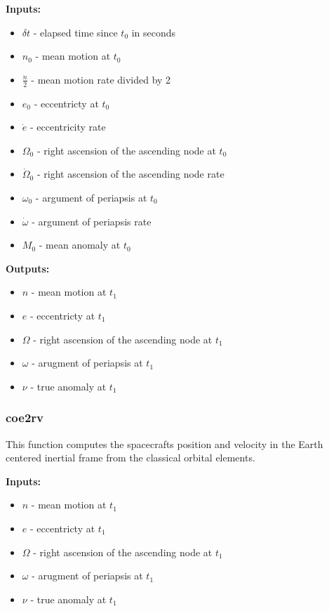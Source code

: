 \documentclass[11pt, reqno]{article}    %
\begin{document}
\noindent \textbf{Inputs: }
\begin{itemize}
    \item \( \delta t \) - elapsed time since \( t_0 \) in seconds
    \item \( n_0 \) - mean motion at \( t_0 \)
    \item \( \frac{\dot{n}}{2} \) - mean motion rate divided by 2
    \item \( e_0 \) - eccentricty at \( t_0 \)
    \item \( \dot{e} \) - eccentricity rate
    \item \( \Omega_0 \) - right ascension of the ascending node at \( t_0 \)
    \item \( \dot{\Omega}_0 \) - right ascension of the ascending node rate
    \item \( \omega_0 \) - argument of periapsis at \( t_0 \)
    \item \( \dot{\omega} \) - argument of periapsis rate
    \item \( M_0 \) - mean anomaly at \( t_0 \)
\end{itemize}

\noindent \textbf{Outputs:}

\begin{itemize}
    \item \( n \) - mean motion at \( t_1 \)
    \item \( e \) - eccentricty at \( t_1 \)
    \item \( \Omega \) - right ascension of the ascending node at \( t_1 \)
    \item \( \omega \) - arugment of periapsis at \( t_1 \)
    \item \( \nu \) - true anomaly at \( t_1 \)
\end{itemize}

\subsubsection*{\textbf{coe2rv}}
This function computes the spacecrafts position and velocity in the Earth centered inertial frame from the classical orbital elements.

\noindent \textbf{Inputs: }
\begin{itemize}
    \item \( n \) - mean motion at \( t_1 \)
    \item \( e \) - eccentricty at \( t_1 \)
    \item \( \Omega \) - right ascension of the ascending node at \( t_1 \)
    \item \( \omega \) - arugment of periapsis at \( t_1 \)
    \item \( \nu \) - true anomaly at \( t_1 \)
\end{itemize}
\end{document}
